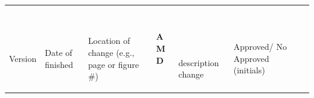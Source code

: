 \documentclass[letterpaper,10pt]{article}
\begin{document}
{\bigskip

\begin{flushleft}
\tablehead{}
\begin{supertabular}{|m{0.47685984in}|m{0.6087598in}|m{1.3587599in}|m{0.23375985in}|m{2.0462599in}|m{0.7337598in}|m{0.6330598in}|}
\hline
~

\centering {}\color{black} Version &
~

\centering {}\color{black} Date of finished &
~

\centering {}\color{black} Location of change
(e.g., page or figure \#) &
\centering {}\bfseries\color{black} A\newline
M\newline
D &
~

~

\centering {}\color{black} description
change &
~

\centering {}\color{black} Approved/ No Approved (initials)
&
~


\end{supertabular}
\end{flushleft}}
\end{document}
